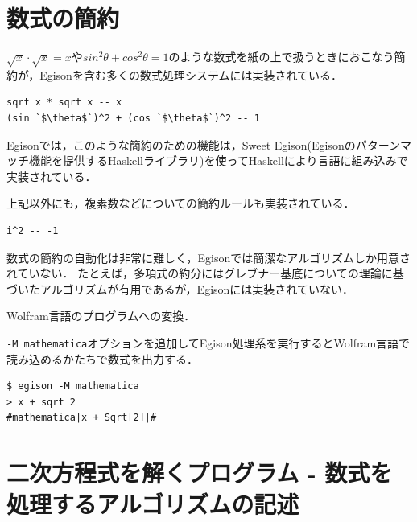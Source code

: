 \section{数式の簡約}\label{quick2-simplify}

$\sqrt{x} \cdot \sqrt{x} = x$や$sin^2\theta + cos^2\theta = 1$のような数式を紙の上で扱うときにおこなう簡約が，Egisonを含む多くの数式処理システムには実装されている．
\begin{lstlisting}[language=egison,numbers=none]
sqrt x * sqrt x -- x
(sin `$\theta$`)^2 + (cos `$\theta$`)^2 -- 1
\end{lstlisting}
Egisonでは，このような簡約のための機能は，Sweet Egison(Egisonのパターンマッチ機能を提供するHaskellライブラリ)を使ってHaskellにより言語に組み込みで実装されている．

上記以外にも，複素数などについての簡約ルールも実装されている．
\begin{lstlisting}[language=egison,numbers=none]
i^2 -- -1
\end{lstlisting}



数式の簡約の自動化は非常に難しく，Egisonでは簡潔なアルゴリズムしか用意されていない．
たとえば，多項式の約分にはグレブナー基底についての理論に基づいたアルゴリズムが有用であるが，Egisonには実装されていない．

Wolfram言語のプログラムへの変換．

\texttt{-M mathematica}オプションを追加してEgison処理系を実行するとWolfram言語で読み込めるかたちで数式を出力する．


\begin{lstlisting}[language=egison,numbers=none]
$ egison -M mathematica
> x + sqrt 2
#mathematica|x + Sqrt[2]|#
\end{lstlisting}

\section{二次方程式を解くプログラム - 数式を処理するアルゴリズムの記述}\label{quick2-quadratic}


